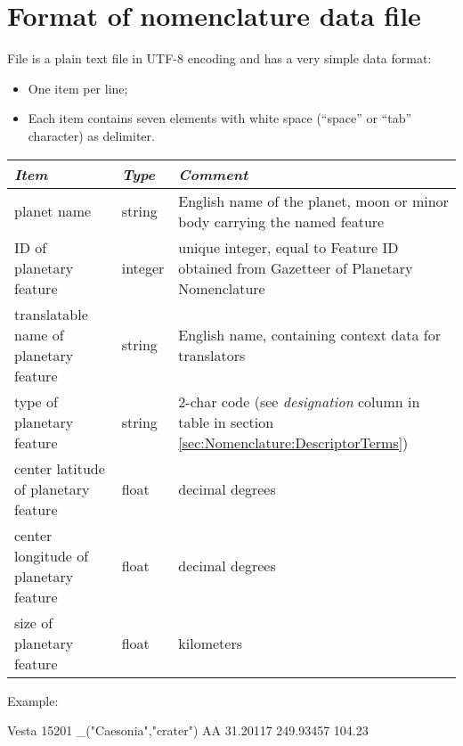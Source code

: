 \section{Format of nomenclature data file}
\label{sec:Nomenclature:format}

File  is a plain text file in UTF-8 encoding and has a very simple data format: 
\begin{itemize}
\item One item per line;
\item Each item contains seven elements with white space (``space'' or ``tab'' character) as delimiter.
\end{itemize}

\begin{longtabu} to \textwidth {l|l|X}\toprule
\emph{Item}                              & \emph{Type} & \emph{Comment}\\\midrule
planet name                              & string  & English name of the planet, moon or minor body carrying the named feature\\\midrule
ID of planetary feature                  & integer & unique integer, equal to Feature ID obtained from Gazetteer of Planetary Nomenclature\\\midrule
translatable name of planetary feature   & string  & English name, containing context data for translators\\\midrule
type of planetary feature                & string  & 2-char code (see \emph{designation} column in table in section \ref{sec:Nomenclature:DescriptorTerms})\\\midrule
center latitude of planetary feature     & float   & decimal degrees\\\midrule
center longitude of planetary feature    & float   & decimal degrees\\\midrule
size of planetary feature                & float   & kilometers\\\bottomrule
\end{longtabu}

Example:
\begin{configfile}
Vesta 15201 _("Caesonia","crater") AA 31.20117 249.93457 104.23
\end{configfile}

